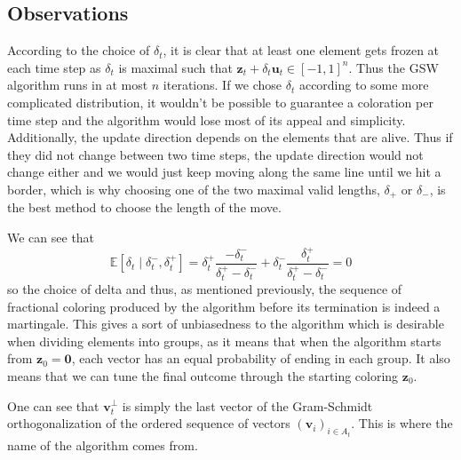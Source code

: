 \documentclass[12pt]{article}
\begin{document}


\subsection{Observations}
According to the choice of $\delta_t$, it is clear that at least one element gets frozen at each time step as $\delta_t$ is maximal such that $\textbf{z}_t+\delta_t\textbf{u}_t\in[-1,1]^n$. Thus the GSW algorithm runs in at most $n$ iterations. If we chose $\delta_t$ according to some more complicated distribution, it wouldn't be possible to guarantee a coloration per time step and the algorithm would lose most of its appeal and simplicity. Additionally, the update direction depends on the elements that are alive. Thus if they did not change between two time steps, the update direction would not change either and we would just keep moving along the same line until we hit a border, which is why choosing one of the two maximal valid lengths, $\delta_+$ or $\delta_-$, is the best method to choose the length of the move.

We can see that
$$\mathbb{E}[\delta_t \mid \delta_t^-, \delta_t^+] = \delta_t^+\frac{-\delta_t^-}{\delta_t^+-\delta_t^-} + \delta_t^- \frac{\delta_t^+}{\delta_t^+-\delta_t^-} =0$$
so the choice of delta and thus, as mentioned previously, the sequence of fractional coloring produced by the algorithm before its termination is indeed a martingale. This gives a sort of unbiasedness to the algorithm which is desirable when dividing elements into groups, as it means that when the algorithm starts from $\textbf{z}_0=\textbf{0}$, each vector has an equal probability of ending in each group. It also means that we can tune the final outcome through the starting coloring $\textbf{z}_0$.

One can see that $\textbf{v}^\perp _t$ is simply the last vector of the Gram-Schmidt orthogonalization of the ordered sequence of vectors $(\textbf{v}_i)_{i\in A_t}$. This is where the name of the algorithm comes from.
\end{document}
